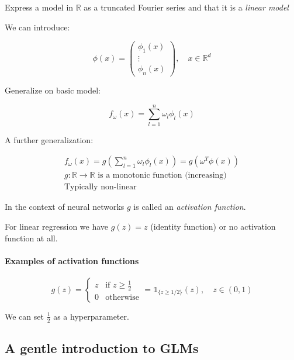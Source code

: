 Express a model in $\mathds{R}$ as a truncated Fourier series and
that it is a \emph{linear model}

\hrulefill

We can introduce:

\begin{equation*}
	\phi (x) = \left(\begin{array}{c}
			\phi_1(x) \\
			\vdots    \\
			\phi_n(x)
		\end{array}\right), \quad x \in \mathds{R}^d
\end{equation*}

Generalize on basic model:

\begin{equation}
	\boxed{f_\omega(x) = \sum_{l=1}^n \omega_l \phi_l(x)}
\end{equation}

A further generalization:

\begin{align*}
	f_\omega(x) = g\left(\sum_{l=1}^n \omega_l \phi_l(x)\right) = g\left(\omega^T\phi(x)\right) \\
	g: \mathds{R} \to \mathds{R} \text{ is a monotonic function (increasing)}                   \\
	\text{Typically non-linear}
\end{align*}

In the context of neural networks $g$ is called an \emph{activation function}.

For linear regression we have $g(z) = z$ (identity function) or
no activation function at all.

\paragraph{Examples of activation functions}

\begin{equation*}
	g(z) = \begin{cases}
		z & \text{if } z \geq \frac{1}{2} \\
		0 & \text{otherwise}
	\end{cases}  = \mathds{1}_{\{z \geq 1/2\}}(z), \quad z \in (0, 1)
\end{equation*}

We can set $\frac{1}{2}$ as a hyperparameter.

\subsection{A gentle introduction to GLMs}

